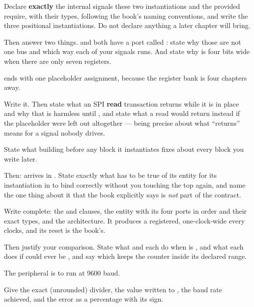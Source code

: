 Declare \textbf{exactly} the internal signals these two instantiations and the provided
 require, with their types, following the book's naming conventions, and write the
three positional instantiations. Do not declare anything a later chapter will bring.

Then answer two things.  and  both have a port called
: state why those are not one bus and which way each of your signals runs. And state
why  is four bits wide when there are only seven registers. 

  ends with one placeholder assignment, because the register bank is four
chapters away.

Write it. Then state what an SPI \textbf{read} transaction returns while it is in place and why that
is harmless until , and state what a read would return instead if the placeholder were
left out altogether --- being precise about what ``returns'' means for a signal nobody drives.

 State what building  before any block it instantiates fixes about every
block you write later.

Then:  arrives in . State exactly what has to be true of its entity for
its instantiation in  to bind correctly without you touching the top again, and name
the one thing about it that the book explicitly says is \emph{not} part of the contract. 

\label{exb:q:2}

 Write  complete: the  and  clauses, the entity
with its four ports in order and their exact types, and the architecture. It produces a registered,
one-clock-wide  every  clocks, and its reset is the book's.

Then justify your comparison. State what  and 
each do when  is , and what each does if  could ever be , and
say which keeps the counter inside its declared range. 

 The peripheral is to run at 9600 baud.

Give the exact (unrounded) divider, the value written to , the baud rate achieved,
and the error as a percentage with its sign.

